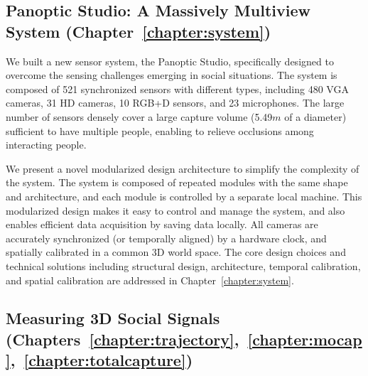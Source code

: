 \subsection{Panoptic Studio: A Massively Multiview System (Chapter~\ref{chapter:system})}
We built a new sensor system, the Panoptic Studio, specifically designed to overcome the sensing challenges emerging in social situations. The system is composed of 521 synchronized sensors with different types, including 480 VGA cameras, 31 HD cameras, 10 RGB+D sensors, and 23 microphones. The large number of sensors densely cover a large capture volume (5.49$m$ of a diameter) sufficient to have multiple people, enabling to relieve occlusions among interacting people. 

We present a novel modularized design architecture to simplify the complexity of the system. The system is composed of repeated modules with the same shape and architecture, and each module is controlled by a separate local machine. This modularized design makes it easy to control and manage the system, and also enables efficient data acquisition by saving data locally. All cameras are accurately synchronized (or temporally aligned) by a hardware clock, and spatially calibrated in a common 3D world space. The core design choices and technical solutions including structural design, architecture, temporal calibration, and spatial calibration are addressed in Chapter~\ref{chapter:system}.



\subsection{Measuring 3D Social Signals (Chapters~\ref{chapter:trajectory},~\ref{chapter:mocap},~\ref{chapter:totalcapture})}

